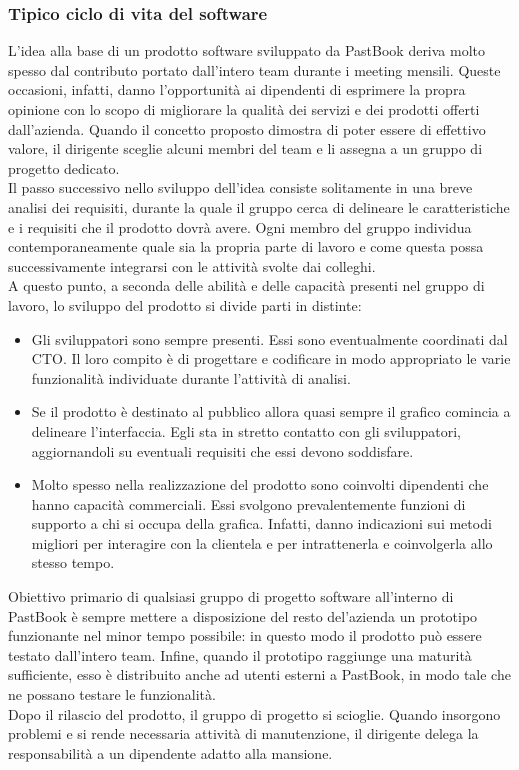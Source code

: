 			\subsubsection{Tipico ciclo di vita del software}
				L'idea alla base di un prodotto software sviluppato da PastBook deriva molto spesso dal contributo portato
				dall'intero team durante i meeting mensili. Queste occasioni, infatti, danno l'opportunità ai dipendenti di esprimere
				la propra opinione con lo scopo di migliorare la qualità dei servizi e dei prodotti offerti dall'azienda. Quando il
				concetto proposto dimostra di poter essere di effettivo valore, il dirigente sceglie alcuni membri del team e li
				assegna a un gruppo di progetto dedicato.\\
				Il passo successivo nello sviluppo dell'idea consiste solitamente in una breve analisi dei requisiti, durante la
				quale il gruppo cerca di delineare le caratteristiche e i requisiti che il prodotto dovrà avere. Ogni membro del
				gruppo individua contemporaneamente quale sia la propria parte di lavoro e come questa possa successivamente
				integrarsi con le attività svolte dai colleghi.\\
				A questo punto, a seconda delle abilità e delle capacità presenti nel gruppo di lavoro, lo sviluppo del prodotto
				si divide parti in distinte:
				\begin{itemize}
					\item Gli sviluppatori sono sempre presenti. Essi sono eventualmente coordinati dal CTO. Il loro compito è
					di progettare e codificare in modo appropriato le varie funzionalità individuate durante l'attività di
					analisi.
					\item Se il prodotto è destinato al pubblico allora quasi sempre il grafico comincia a delineare
					l'interfaccia. Egli sta in stretto contatto con gli sviluppatori, aggiornandoli su eventuali requisiti
					che essi devono soddisfare.
					\item Molto spesso nella realizzazione del prodotto sono coinvolti dipendenti che hanno capacità commerciali.
					Essi svolgono prevalentemente funzioni di supporto a chi si occupa della grafica. Infatti, danno indicazioni
					sui metodi migliori per interagire con la clientela e per intrattenerla e coinvolgerla allo stesso tempo.
				\end{itemize}
				Obiettivo primario di qualsiasi gruppo di progetto software all'interno di PastBook è sempre mettere a
				disposizione del resto del'azienda un prototipo funzionante nel minor tempo possibile: in questo modo il prodotto può
				essere testato dall'intero team. Infine, quando il prototipo raggiunge una maturità sufficiente, esso è distribuito
				anche ad utenti esterni a PastBook, in modo tale che ne possano testare le funzionalità.\\
				Dopo il rilascio del prodotto, il gruppo di progetto si scioglie. Quando insorgono problemi e si rende necessaria
				attività di manutenzione, il dirigente delega la responsabilità a un dipendente adatto alla mansione.
				
